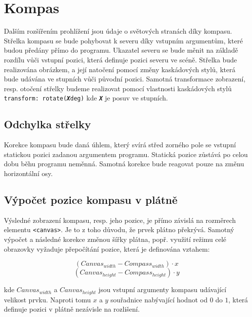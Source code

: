 \section{Kompas}
Dalším rozšířením prohlížení jsou údaje o světových stranách díky kompasu. Střelka kompasu se bude pohybovat k severu díky vstupním argumentům, které budou předány přímo do programu. Ukazatel severu se bude měnit na základě rozdílu vůči vstupní pozici, která definuje pozici severu ve scéně. Střelka bude realizována obrázkem, a její natočení pomocí změny kaskádových stylů, která bude udávána ve stupních vůči původní pozici. Samotná transformace zobrazení, resp. otočení střelky budeme realizovat pomocí vlastnosti kaskádových stylů \texttt{transform: rotate(\textbf{\emph{X}}deg)} kde \texttt{\textbf{\emph{X}}} je posuv ve stupních.

\subsection{Odchylka střelky}
Korekce kompasu bude daná úhlem, který svírá střed zorného pole se vstupní statickou pozici zadanou argumentem programu. Statická pozice zůstává po celou dobu běhu programu neměnná. Samotná korekce bude reagovat pouze na změnu horizontální osy.

\subsection{Výpočet pozice kompasu v plátně}
Výsledné zobrazení kompasu, resp. jeho pozice, je přímo závislá na rozměrech elementu \texttt{<canvas>}. Je to z toho důvodu, že prvek plátno překrývá. Samotný výpočet a následné korekce změnou šířky plátna, popř. využití režimu celé obrazovky vyžaduje přepočítání pozice, která je definována vztahem:

$$ \left( Canvas_{width} - Compass_{width}\right) \cdot x  $$
$$ \left( Canvas_{height} - Compass_{height}\right) \cdot y  $$

kde $Canvas_{width}$ a $Canvas_{height}$ jsou vstupní argumenty kompasu udávající velikost prvku. Naproti tomu  $x$ a $y$ souřadnice nabývající hodnot od $0$ do $1$, která definuje pozici v plátně nezávisle na rozlišení.


